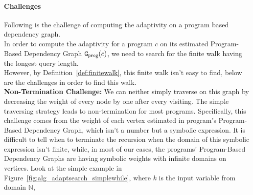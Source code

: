 \paragraph*{Challenges}
Following is the challenge of computing the adaptivity on a program based dependency graph.
\\
In order to 
compute the adaptivity for a program $c$ on its estimated Program-Based Dependency Graph $\mathtt{{G_{prog}}}(c)$, we need to 
search for the finite walk having the longest query length.
\\
However, by Definition~\ref{def:finitewalk}, this finite walk isn't easy to find, below are the challenges in order to find this walk.
\\
\textbf{Non-Termination Challenge:}
We can neither simply traverse on this graph by decreasing the weight of every node by one after every visiting. 
The simple 
traversing strategy leads to non-termination for most programs. 
Specifically, this challenge comes from the weight of each vertex estimated in program's Program-Based Dependency Graph,
which isn't a number but a symbolic expression. 
It is difficult to tell when to terminate the recursion when the domain of this symbolic expression isn't finite,
while, in most of our cases, the programs' Program-Based Dependency Graphs are having symbolic weights with infinite domains on vertices.
Look at the simple example in Figure~\ref{fig:alg_adaptsearch_simplewhile}, where $k$ is the input variable from domain $\mathbb{N}$,
